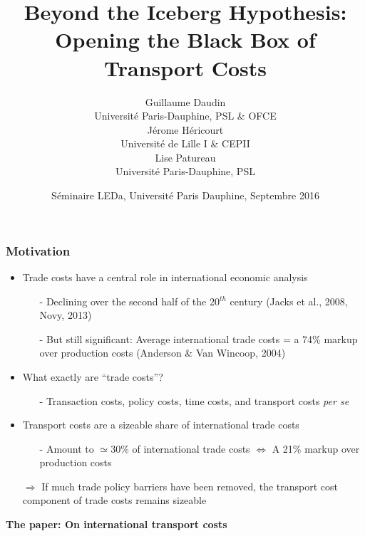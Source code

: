 \documentclass[10 pt,Helvetica, french]{beamer}
\date[September 2016]{S\'{e}minaire LEDa, Universit\'{e} Paris Dauphine, Septembre 2016}
\title[Trade Costs Black Box]{Beyond the Iceberg Hypothesis: \\Opening the Black Box of Transport Costs}
\author[Daudin et al.]{Guillaume Daudin\\
{\footnotesize Universit\'{e} Paris-Dauphine, PSL \& OFCE }\\ \smallskip
J\'{e}rome H\'{e}ricourt \\
{\footnotesize Universit\'{e} de Lille I \& CEPII }\\  \smallskip
Lise Patureau \\
{\footnotesize  Universit\'{e} Paris-Dauphine, PSL}}
\begin{document}
\begin{frame}[plain]
\titlepage
\end{frame}


\begin{frame}
\frametitle{Motivation}
\begin{itemize}
\item Trade costs have a central role in international economic analysis \vspace{0.1cm}
\begin{itemize}
\item[-] Declining over the second half of the 20$^{th}$ century (Jacks et al., 2008, Novy, 2013) \vspace{0.1cm}
\item[-] But still significant: Average international trade costs = a 74\% markup over production costs (Anderson \& Van Wincoop, 2004)
\end{itemize}
\item What exactly are ``trade costs''?  \vspace{0.1cm}
\begin{itemize}
\item[-] Transaction costs, policy costs, time costs, and transport costs \textit{per se}
\end{itemize}
\item Transport costs are a sizeable share of international trade costs \vspace{0.1cm}
\begin{itemize}
\item[-]  Amount to $\simeq 30\%$ of international trade costs  $\Leftrightarrow$ A 21\% markup over production costs  \vspace{0.1cm}
\end{itemize}
\item[$\Rightarrow$] If much trade policy barriers have been removed, the transport cost component of trade costs remains sizeable \vspace{0.1cm}
\end{itemize}
\textbf{The paper: On international transport costs}

\end{frame}
\end{document}
